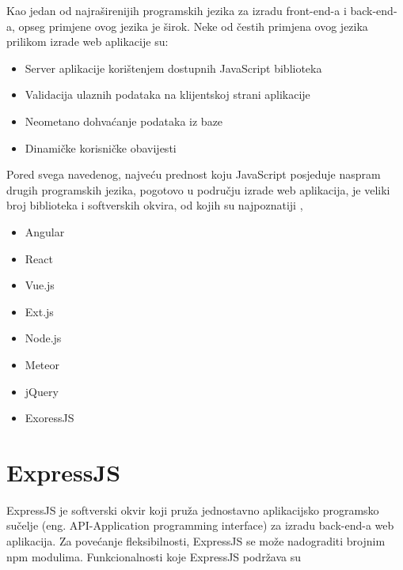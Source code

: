 \documentclass[12pt, oneside, onecolumn]{book}
\begin{document}
{Kao jedan od najraširenijih programskih jezika za izradu front-end-a i back-end-a, opseg primjene ovog jezika je širok. Neke od čestih primjena ovog jezika prilikom izrade web aplikacije su:

\begin{itemize}
\item Server aplikacije korištenjem dostupnih JavaScript biblioteka
\item Validacija ulaznih podataka na klijentskoj strani aplikacije
\item Neometano dohvaćanje podataka iz baze
\item Dinamičke korisničke obavijesti
\end{itemize}

Pored svega navedenog, najveću prednost koju JavaScript posjeduje naspram drugih programskih jezika, pogotovo u području izrade web aplikacija, je veliki broj biblioteka i softverskih okvira, od kojih su najpoznatiji \cite{js}, \cite{ajs}

\begin{itemize}
\item Angular
\item React
\item Vue.js
\item Ext.js
\item Node.js
\item Meteor
\item jQuery
\item ExoressJS
\end{itemize}

\section{ExpressJS}
ExpressJS je softverski okvir koji pruža jednostavno aplikacijsko programsko sučelje (eng. API-Application programming interface) za izradu back-end-a web aplikacija. Za povećanje fleksibilnosti, ExpressJS se može nadograditi brojnim npm modulima. Funkcionalnosti koje ExpressJS podržava su \cite{expss} 

}
\end{document}
